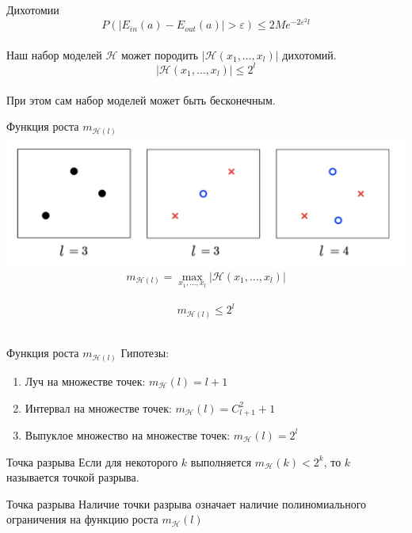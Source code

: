 \documentclass[10pt]{beamer}
\begin{document}
{
\begin{frame}{Дихотомии}  
  $$P(\vert E_{in}(a) - E_{out}(a) \vert > \varepsilon) \leq 2 M e^{-2\varepsilon^2l}$$  \\
  Наш набор моделей $\mathcal{H}$ может породить $\vert \mathcal{H}(x_1,\dots, x_l) \vert$ дихотомий.\\
  $$\vert \mathcal{H}(x_1,\dots, x_l) \vert \leq 2^l$$\\
  При этом сам набор моделей может быть бесконечным.
\end{frame}
}

\begin{frame}{Функция роста $m_{\mathcal{H}(l)}$}  
  \centering
  \includegraphics[width=\textwidth, keepaspectratio]{images/growth}
  $$m_{\mathcal{H}(l)} = \max\limits_{x_1,\dots,x_l} \vert \mathcal{H}(x_1,\dots, x_l) \vert$$\\
  $$m_{\mathcal{H}(l)} \leq 2^l$$\\
\end{frame}

\begin{frame} {Функция роста $m_{\mathcal{H}(l)}$}
  Гипотезы:\\  
  \begin{enumerate}
    \item Луч на множестве точек: $m_{\mathcal{H}}(l) = l+1 $
    \item Интервал на множестве точек: $m_{\mathcal{H}}(l) = C_{l+1}^2 + 1$
    \item Выпуклое множество на множестве точек: $m_{\mathcal{H}}(l) = 2^l$ 
  \end{enumerate}
\end{frame}

{
\begin{frame}{Точка разрыва}  
  Если для некоторого $k$ выполняется $m_{\mathcal{H}}(k) < 2^k$, то $k$ называется точкой разрыва.
\end{frame}
}

\begin{frame}{Точка разрыва}  
  \centering
  Наличие точки разрыва означает наличие полиномиального ограничения на функцию роста $m_{\mathcal{H}}(l)$
\end{frame}
\end{document}
